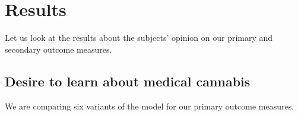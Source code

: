 \documentclass[
]{article}
\begin{document}
\hypertarget{results}{%
\section{Results}\label{results}}

Let us look at the results about the subjects' opinion on our primary
and secondary outcome measures.

\hypertarget{desire-to-learn-about-medical-cannabis}{%
\subsection{Desire to learn about medical
cannabis}\label{desire-to-learn-about-medical-cannabis}}

We are comparing six variants of the model for our primary outcome
measures.
\end{document}
